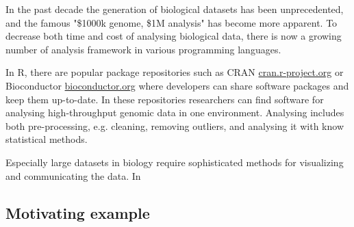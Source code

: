 
%





In the past decade the generation of biological datasets has been unprecedented,
and the famous "\$1000k genome, \$1M analysis"\cite{} has become more apparent.
To decrease both time and cost of analysing biological data, there is now a
growing number of analysis framework in various programming languages. \cite{}

In R, there are popular package repositories such as CRAN
\url{cran.r-project.org} or Bioconductor \url{bioconductor.org} where developers
can share software packages and keep them up-to-date. In these repositories
researchers can find software for analysing high-throughput genomic data in one
environment. Analysing includes both pre-processing, e.g. cleaning, removing
outliers, and analysing it with know statistical methods.

Especially large datasets in biology require sophisticated methods for
visualizing and communicating the data. In



\subsection*{Motivating example}


